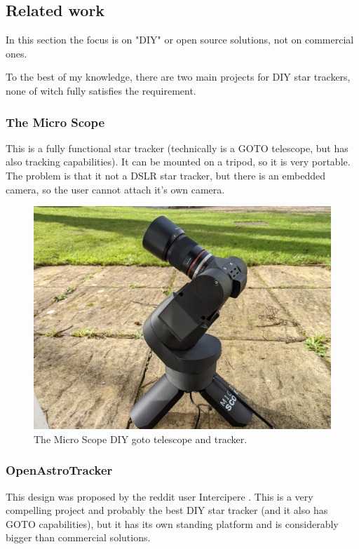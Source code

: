 \documentclass[]{article}
\begin{document}
\subsection{Related work}
In this section the focus is on "DIY" or open source solutions, not on commercial ones.

To the best of my knowledge, there are two main projects for DIY star trackers, none of witch fully satisfies the requirement.

\subsubsection{The Micro Scope}

This is a fully functional star tracker \cite{microscope} (technically is a GOTO telescope, but has also tracking capabilities). It can be mounted on a tripod, so it is very portable. The problem is that it not a DSLR star tracker, but there is an embedded camera, so the user cannot attach it's own camera. 

\begin{figure}[H]
	\centering
	\includegraphics[width=0.7\linewidth]{images/background/themicroscope}
	\caption{The Micro Scope DIY goto telescope and tracker.}
\end{figure}

\subsubsection{OpenAstroTracker}

This design was proposed by the reddit user Intercipere \cite{openastrotracker}. This is a very compelling project and probably the best DIY star tracker (and it also has GOTO capabilities), but it has its own standing platform and is considerably bigger than commercial solutions. 
\end{document}
